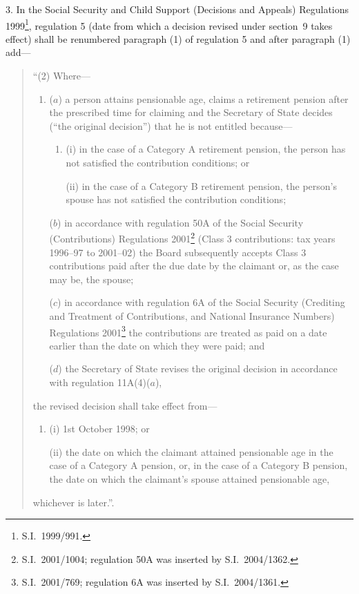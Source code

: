 \documentclass[12pt,a4paper]{article}
\begin{document}
3.  In the Social Security and Child Support (Decisions and Appeals) Regulations 1999\footnote{S.I.~1999/991.}, regulation 5 (date from which a decision revised under section~9 takes effect) shall be renumbered paragraph (1) of regulation 5 and after paragraph (1) add—
\begin{quotation}
“(2) Where—
\begin{enumerate}\item[]
($a$) a person attains pensionable age, claims a retirement pension after the prescribed time for claiming and the Secretary of State decides (“the original decision”) that he is not entitled because—
\begin{enumerate}\item[]
(i) in the case of a Category A retirement pension, the person has not satisfied the contribution conditions; or

(ii) in the case of a Category B retirement pension, the person’s spouse has not satisfied the contribution conditions;
\end{enumerate}

($b$) in accordance with regulation 50A of the Social Security (Contributions) Regulations 2001\footnote{S.I.~2001/1004; regulation 50A was inserted by S.I.~2004/1362.} (Class 3 contributions: tax years 1996--97 to 2001--02) the Board subsequently accepts Class 3 contributions paid after the due date by the claimant or, as the case may be, the spouse;

($c$) in accordance with regulation 6A of the Social Security (Crediting and Treatment of Contributions, and National Insurance Numbers) Regulations 2001\footnote{S.I.~2001/769; regulation 6A was inserted by S.I.~2004/1361.} the contributions are treated as paid on a date earlier than the date on which they were paid; and

($d$) the Secretary of State revises the original decision in accordance with regulation 11A(4)($a$),
\end{enumerate}
the revised decision shall take effect from—
\begin{enumerate}\item[]
(i) 1st October 1998; or

(ii) the date on which the claimant attained pensionable age in the case of a Category A pension, or, in the case of a Category B pension, the date on which the claimant’s spouse attained pensionable age,
\end{enumerate}
whichever is later.”.
\end{quotation}
\end{document}
